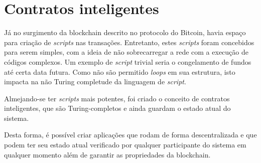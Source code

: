 \documentclass{ufsctex/ufsctex}
\begin{document}
\section{Contratos inteligentes}

Já no surgimento da blockchain descrito no protocolo do Bitcoin, havia espaço para 
criação de \textit{scripts} nas transações. Entretanto, estes \textit{scripts} foram concebidos
para serem simples, com a ideia de não sobrecarregar a rede com a execução de códigos
complexos. Um exemplo de \textit{script} trivial seria o congelamento de fundos até
certa data futura. Como não são  permitido \textit{loops} em sua estrutura, isto impacta
na não Turing completude da linguagem de \textit{script}.\cite{nakamoto2012bitcoin}

Almejando-se ter \textit{scripts} mais potentes, foi criado o conceito de contratos
inteligentes, que são Turing-completos e ainda guardam o estado atual do sistema.
\cite{ethereum}

Desta forma, é possível criar aplicações que rodam de forma descentralizada e que podem
ter seu estado atual verificado por qualquer participante do sistema em qualquer
momento além de garantir as propriedades da blockchain.



\end{document}
